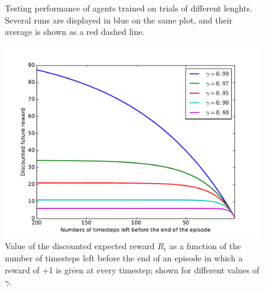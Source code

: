 \begin{figure}
	\centering
	\caption{Testing performance of agents trained on trials of different
	lenghts. Several runs are displayed in blue on the same plot, and their
	average is shown as a red dashed line.}
	\label{fig:20permsLR_rewards}
\end{figure}

\begin{figure}
	\centering
	\includegraphics[width=0.8\linewidth]{fig/gamma_impact.pdf}
	\caption{Value of the discounted expected reward $R_t$ as a function
	of the number of timesteps left before the end of an episode in which
	a reward of +1 is given at every timestep; shown for different values
	of $\gamma$.}
	\label{fig:gamma_impact}
\end{figure}

